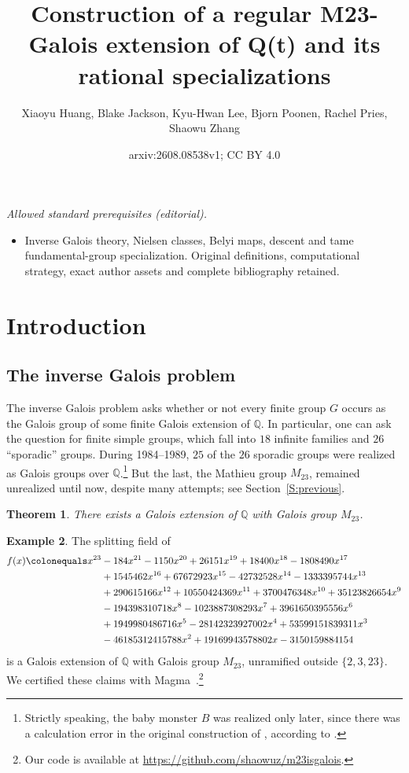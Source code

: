 \documentclass[12pt,reqno]{amsart}
\title{Construction of a regular M23-Galois extension of Q(t) and its rational specializations}
\author{Xiaoyu Huang, Blake Jackson, Kyu-Hwan Lee, Bjorn Poonen, Rachel Pries, Shaowu Zhang}
\date{arxiv:2608.08538v1; CC BY 4.0}
\newcommand{\Q}{\mathbb{Q}}
\newtheorem{theorem}{Theorem}[section]
\theoremstyle{definition}
\newtheorem{example}[theorem]{Example}
\theoremstyle{remark}
\begin{document}
\maketitle
\noindent\textit{Allowed standard prerequisites (editorial).}\begin{itemize}
\item Inverse Galois theory, Nielsen classes, Belyi maps, descent and tame fundamental-group specialization. Original definitions, computational strategy, exact author assets and complete bibliography retained.
\end{itemize}\medskip
\section{Introduction}\label{S:introduction}

\subsection{The inverse Galois problem}
\label{S:inverse Galois problem}

The inverse Galois problem asks whether or not every finite group $G$ occurs as the Galois group of 
some finite Galois extension of $\Q$.
In particular, one can ask the question for finite simple groups, which fall into $18$ infinite families and $26$ ``sporadic'' groups.
During 1984--1989, $25$ of the $26$ sporadic groups were realized as Galois groups over $\Q$.\footnote{Strictly speaking, the baby monster $B$ was realized only later, since there was a calculation error in the original construction of \cite{Hunt1986}, according to \cite[p.~161]{Malle-Matzat2018}.}
But the last, the Mathieu group $M_{23}$, remained unrealized until now, despite many attempts; see Section~\ref{S:previous}.

\begin{theorem}
\label{T:over Q}
There exists a Galois extension of $\Q$ with Galois group $M_{23}$.
\end{theorem}

\begin{example}
\label{Ex:M23 over Q}
The splitting field of 
\begin{align*}
    f(x) \colonequals x^{23} &- 184 x^{21} - 1150 x^{20} + 26151 x^{19} + 18400 x^{18} - 1808490 x^{17} \\
      &+ 1545462 x^{16} + 67672923 x^{15} - 42732528 x^{14} - 1333395744 x^{13} \\
      &+ 290615166 x^{12} + 10550424369 x^{11} + 3700476348 x^{10} + 35123826654 x^9 \\
      &- 194398310718 x^8 - 1023887308293 x^7 + 3961650395556 x^6 \\
      &+ 1949980486716 x^5 - 28142323927002 x^4 + 53599151839311 x^3 \\
      &- 46185312415788 x^2 + 19169943578802 x - 3150159884154
\end{align*}
is a Galois extension of $\Q$ with Galois group $M_{23}$, unramified outside $\{2,3,23\}$. We certified these claims with Magma~\cite{Magma}.\footnote{Our code is available at \url{https://github.com/shaowuz/m23isgalois}.}
\end{example}
\end{document}

